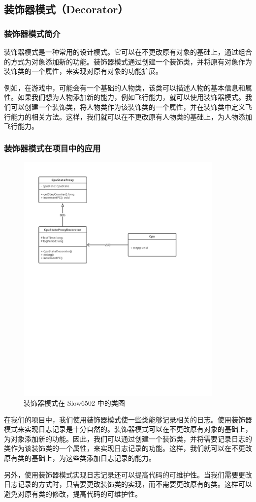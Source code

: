 \subsection{装饰器模式（Decorator）}

\subsubsection{装饰器模式简介}


装饰器模式是一种常用的设计模式。它可以在不更改原有对象的基础上，通过组合的方式为对象添加新的功能。装饰器模式通过创建一个装饰类，并将原有对象作为装饰类的一个属性，来实现对原有对象的功能扩展。

例如，在游戏中，可能会有一个基础的人物类，该类可以描述人物的基本信息和属性。如果我们想为人物添加新的能力，例如飞行能力，就可以使用装饰器模式。我们可以创建一个装饰类，将人物类作为该装饰类的一个属性，并在装饰类中定义飞行能力的相关方法。这样，我们就可以在不更改原有人物类的基础上，为人物添加飞行能力。

\subsubsection{装饰器模式在项目中的应用}

\begin{figure}[h]
  \centering
  \includegraphics[width=0.9\textwidth]{figures/装饰器模式.pdf}
  \caption{装饰器模式在 Slow6502 中的类图}
\end{figure}

在我们的项目中，我们使用装饰器模式使一些类能够记录相关的日志。使用装饰器模式来实现日志记录是十分自然的。装饰器模式可以在不更改原有对象的基础上，为对象添加新的功能。因此，我们可以通过创建一个装饰类，并将需要记录日志的类作为该装饰类的一个属性，来实现日志记录的功能。这样，我们就可以在不更改原有类的基础上，为这些类添加日志记录的能力。

另外，使用装饰器模式实现日志记录还可以提高代码的可维护性。当我们需要更改日志记录的方式时，只需要更改装饰类的实现，而不需要更改原有的类。这样可以避免对原有类的修改，提高代码的可维护性。